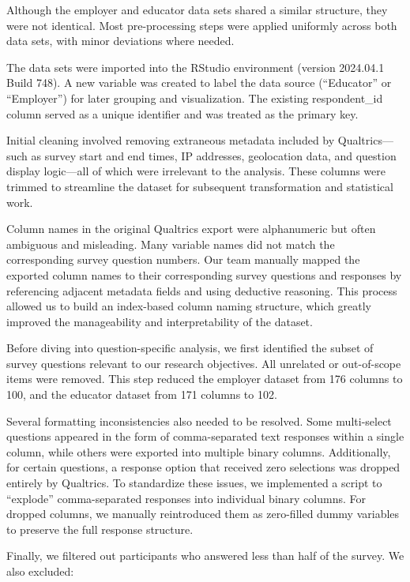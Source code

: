 \documentclass[
  11pt,
  letterpaper,
  DIV=11,
  numbers=noendperiod]{scrartcl}
\begin{document}
Although the employer and educator data sets shared a similar structure,
they were not identical. Most pre-processing steps were applied
uniformly across both data sets, with minor deviations where needed.

The data sets were imported into the RStudio environment (version
2024.04.1 Build 748). A new variable was created to label the data
source (``Educator'' or ``Employer'') for later grouping and
visualization. The existing respondent\_id column served as a unique
identifier and was treated as the primary key.

Initial cleaning involved removing extraneous metadata included by
Qualtrics---such as survey start and end times, IP addresses,
geolocation data, and question display logic---all of which were
irrelevant to the analysis. These columns were trimmed to streamline the
dataset for subsequent transformation and statistical work.

Column names in the original Qualtrics export were alphanumeric but
often ambiguous and misleading. Many variable names did not match the
corresponding survey question numbers. Our team manually mapped the
exported column names to their corresponding survey questions and
responses by referencing adjacent metadata fields and using deductive
reasoning. This process allowed us to build an index-based column naming
structure, which greatly improved the manageability and interpretability
of the dataset.

Before diving into question-specific analysis, we first identified the
subset of survey questions relevant to our research objectives. All
unrelated or out-of-scope items were removed. This step reduced the
employer dataset from 176 columns to 100, and the educator dataset from
171 columns to 102.

Several formatting inconsistencies also needed to be resolved. Some
multi-select questions appeared in the form of comma-separated text
responses within a single column, while others were exported into
multiple binary columns. Additionally, for certain questions, a response
option that received zero selections was dropped entirely by Qualtrics.
To standardize these issues, we implemented a script to ``explode''
comma-separated responses into individual binary columns. For dropped
columns, we manually reintroduced them as zero-filled dummy variables to
preserve the full response structure.

Finally, we filtered out participants who answered less than half of the
survey. We also excluded:
\end{document}
